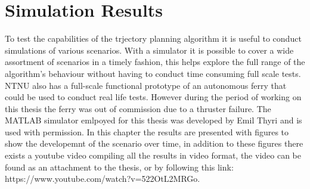 \section{Simulation Results}


To test the capabilities of the trjectory planning algorithm it is useful to conduct simulations of various scenarios.
With a simulator it is possible to cover a wide assortment of scenarios in a timely fashion, this helps explore the full
range of the algorithm's behaviour without having to conduct time consuming full scale tests. NTNU also has a full-scale
functional prototype of an autonomous ferry that could be used to conduct real life tests. However during the period of working
on this thesis the ferry was out of commission due to a thruster failure.
The MATLAB simulator emlpoyed for this thesis was developed by Emil Thyri and is used with permission. In this chapter the results
are presented with figures to show the developemnt of the scenario over time, in addition to these figures there exists a youtube video compiling
all the results in video format, the video can be found as an attachment to the thesis, or by following this link: https://www.youtube.com/watch?v=522OtL2MRGo.

